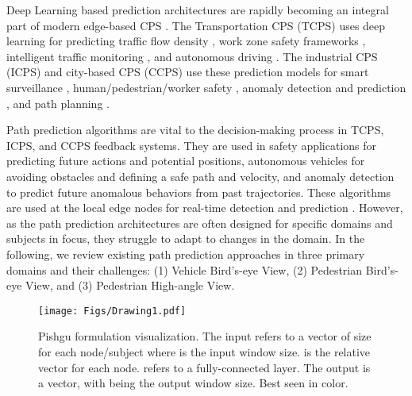 \documentclass[sigconf]{acmart}
\begin{document}
Deep Learning based prediction architectures are rapidly becoming an integral part of modern edge-based CPS \cite{Zhou2021wide_atten, Isern2020Reconfig, deniz2022efficient}. The Transportation CPS (TCPS) uses deep learning for predicting traffic flow density \cite{Jeong2013traffFlow, chen2017research}, work zone safety frameworks \cite{sabeti2021toward, fang2018detecting, cai2020context}, intelligent traffic monitoring \cite{Chen2020WITM}, and autonomous driving \cite{cui2019multimodal, hussain2022vision}. The industrial CPS (ICPS) and city-based CPS (CCPS)  use these prediction models for smart surveillance \cite{Isern2020Reconfig, wu2019deep, pazho2023ancilia}, human/pedestrian/worker safety \cite{deniz2022efficient, wang2022intelligent}, anomaly detection and prediction \cite{jones2014anomaly, pustokhina2021automated}, and path planning \cite{farooq2021flow}. 

Path prediction algorithms are vital to the decision-making process in TCPS, ICPS, and CCPS feedback systems. They are used in safety applications for predicting future actions and potential positions, autonomous vehicles for avoiding obstacles and defining a safe path and velocity, and anomaly detection to predict future anomalous behaviors from past trajectories. These algorithms are used at the local edge nodes for real-time detection and prediction \cite{Isern2020Reconfig, sanchez2021real, jeon2020scale}. However, as the path prediction architectures are often designed for specific domains and subjects in focus, they struggle to adapt to changes in the domain. In the following, we review existing path prediction approaches in three primary domains and their {challenges}: (1) Vehicle Bird's-eye View, (2) Pedestrian Bird's-eye View, and (3) Pedestrian High-angle View.

\begin{figure*}[!b]
        \centering
               \texttt{[image: Figs/Drawing1.pdf]}
                
                \caption{Pishgu formulation visualization. The input  refers to a vector of size  for each node/subject where  is the input window size.  is the relative vector for each node.  refers to a fully-connected layer. The output is a  vector, with  being the output window size. Best seen in color.}
                                
                \label{fig:pishgu}
                \vspace{-10pt}
\end{figure*}
\end{document}
